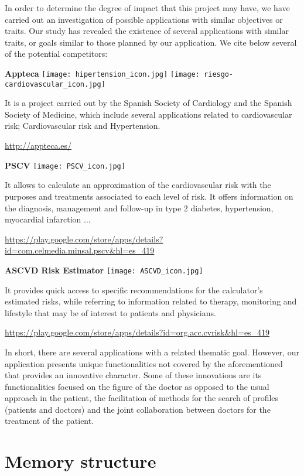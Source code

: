 \documentclass[11pt,spanish,
		listoftables,listoffigures]
		{tfgplantilla}
\begin{document}
In order to determine the degree of impact that this project may have, we have carried out an investigation of possible applications with similar objectives or traits. Our study has revealed the existence of several applications with similar traits, or goals similar to those planned by our application. We cite below several of the potential competitors:

\noindent
\textbf {Appteca }
\texttt{[image: hipertension\_icon.jpg]}
\texttt{[image: riesgo-cardiovascular\_icon.jpg]}  

\noindent
It is a project carried out by the Spanish Society of Cardiology and the Spanish Society of Medicine, which include several applications related to cardiovascular risk; Cardiovascular risk and Hypertension.

\noindent \url{http://appteca.es/}

\noindent
\textbf {PSCV}
\texttt{[image: PSCV\_icon.jpg]}

\noindent
It allows to calculate an approximation of the cardiovascular risk with the purposes and treatments associated to each level of risk. It offers information on the diagnosis, management and follow-up in type 2 diabetes, hypertension, myocardial infarction ...

\noindent \url{https://play.google.com/store/apps/details?id=com.celmedia.minsal.pscv&hl=es_419} 

\newpage
\noindent
\textbf {ASCVD Risk Estimator}
\texttt{[image: ASCVD\_icon.jpg]}

\noindent
It provides quick access to specific recommendations for the calculator's estimated risks, while referring to information related to therapy, monitoring and lifestyle that may be of interest to patients and physicians.

\noindent \url{https://play.google.com/store/apps/details?id=org.acc.cvrisk&hl=es_419}

In short, there are several applications with a related thematic goal. However, our application presents unique functionalities not covered by the aforementioned that provides an innovative character. 
Some of these innovations are its functionalities focused on the figure of the doctor as opposed to the usual approach in the patient, the facilitation of methods for the search of profiles (patients and doctors) and the joint collaboration between doctors for the treatment of the patient.

\section{Memory structure}
\end{document}
